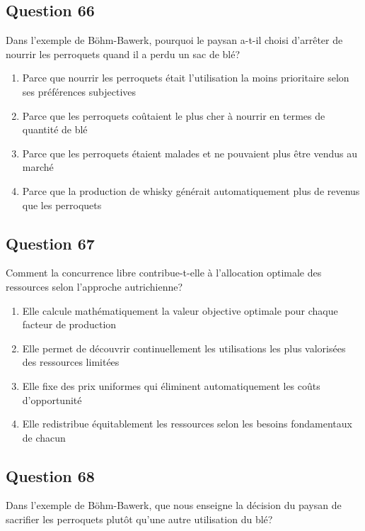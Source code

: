 \documentclass[12pt,a4paper]{article}
\begin{document}
\bigskip


\subsection*{Question 66}
Dans l'exemple de Böhm-Bawerk, pourquoi le paysan a-t-il choisi d'arrêter de nourrir les perroquets quand il a perdu un sac de blé?

\begin{enumerate}[label=\Alph*., leftmargin=*]
\item Parce que nourrir les perroquets était l'utilisation la moins prioritaire selon ses préférences subjectives
\item Parce que les perroquets coûtaient le plus cher à nourrir en termes de quantité de blé
\item Parce que les perroquets étaient malades et ne pouvaient plus être vendus au marché
\item Parce que la production de whisky générait automatiquement plus de revenus que les perroquets
\end{enumerate}

\bigskip


\subsection*{Question 67}
Comment la concurrence libre contribue-t-elle à l'allocation optimale des ressources selon l'approche autrichienne?

\begin{enumerate}[label=\Alph*., leftmargin=*]
\item Elle calcule mathématiquement la valeur objective optimale pour chaque facteur de production
\item Elle permet de découvrir continuellement les utilisations les plus valorisées des ressources limitées
\item Elle fixe des prix uniformes qui éliminent automatiquement les coûts d'opportunité
\item Elle redistribue équitablement les ressources selon les besoins fondamentaux de chacun
\end{enumerate}

\bigskip


\subsection*{Question 68}
Dans l'exemple de Böhm-Bawerk, que nous enseigne la décision du paysan de sacrifier les perroquets plutôt qu'une autre utilisation du blé?
\end{document}
